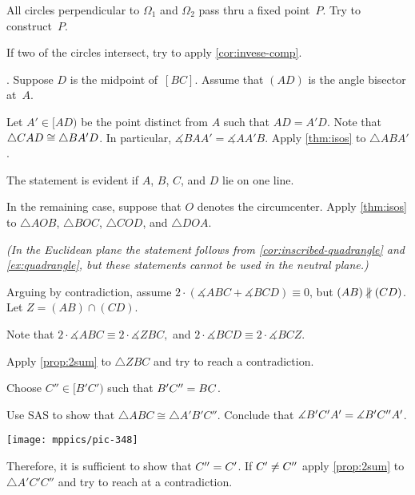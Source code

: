 All circles perpendicular to $\Omega_1$ and $\Omega_2$ pass thru a fixed point~$P$.
Try to construct~$P$.

If two of the circles intersect, try to apply \ref{cor:invese-comp}.

\setcounter{eqtn}{0}

\parbf{\ref{ex:abs-bisect=median}}.
Suppose $D$ is the midpoint of~$[BC]$.
Assume that $(AD)$ is the angle bisector at~$A$.

Let $A'\in [AD)$ be the point distinct from $A$ such that $AD=A'D$.
Note that $\triangle CAD\cong\triangle BA'D$.
In particular, $\measuredangle BAA'=\measuredangle AA'B$.
Apply \ref{thm:isos} to  $\triangle ABA'$.

The statement is evident if $A$, $B$, $C$, and $D$ lie on one line.

In the remaining case, suppose that $O$ denotes the circumcenter.
Apply \ref{thm:isos} to
$\triangle AOB$,
$\triangle BOC$, 
$\triangle COD$, 
and
$\triangle DOA$. 

\textit{(In the Euclidean plane the statement follows from \ref{cor:inscribed-quadrangle} and \ref{ex:quadrangle},
but these statements cannot be used in the neutral plane.)}

Arguing by contradiction, 
assume 
$2\cdot(\measuredangle ABC+\measuredangle BCD)\equiv0$, 
but $(AB)\nparallel(C D)$.
Let $Z=(AB)\cap(CD)$.

Note that 
$
2\cdot \measuredangle ABC\equiv 2\cdot \measuredangle ZBC,
$ and
$2\cdot \measuredangle BCD\equiv 2\cdot \measuredangle BCZ$.

Apply \ref{prop:2sum} to $\triangle ZBC$ and try to reach a contradiction.

Choose $C''\in [B'C')$ such that $B'C''=BC$.

Use SAS to show that $\triangle ABC\cong \triangle A'B'C''$.
Conclude that $\measuredangle B'C'A'= \measuredangle B'C''A'$.

\begin{Figure}
\vskip-0mm
\centering
\texttt{[image: mppics/pic-348]}
\end{Figure}

Therefore, it is sufficient to show that $C''=C'$.
If $C'\ne C''$ apply \ref{prop:2sum} to $\triangle A'C'C''$ and try to reach at a contradiction.

